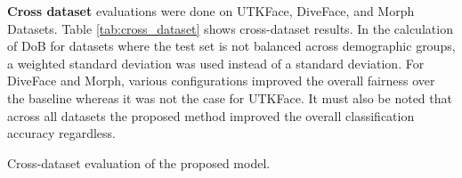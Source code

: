 \documentclass[runningheads]{llncs}
\begin{document}
\textbf{Cross dataset} evaluations were done on UTKFace, DiveFace, and Morph Datasets. Table \ref{tab:cross_dataset} shows cross-dataset results. In the calculation of DoB for datasets where the test set is not balanced across demographic groups, a weighted standard deviation was used instead of a standard deviation.  For DiveFace and Morph, various configurations improved the overall fairness over the baseline whereas it was not the case for UTKFace. It must also be noted that across all datasets the proposed method improved the overall classification accuracy regardless.





\begin{table}
\centering
\caption{Cross-dataset evaluation of the proposed model.}
\label{tab:cross_dataset}
\resizebox{\textwidth}{!}{

}
\end{table}
\end{document}
